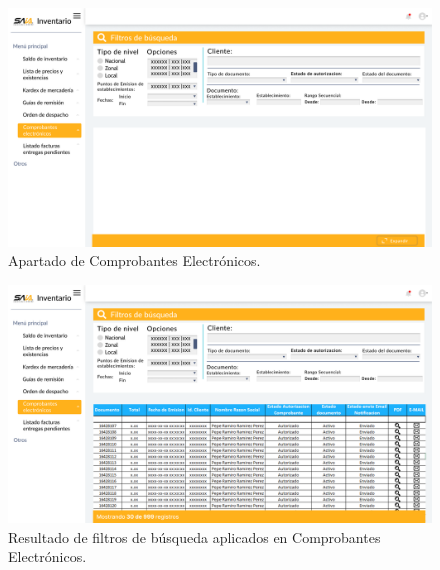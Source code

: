 \documentclass{scrreprt}
\begin{document}
    \begin{figure}[!htpb]
        \centerline{\includegraphics[scale=.22]{images/prototype/web/Comprobantes emitidos.png}}
        \caption{Apartado de Comprobantes Electrónicos.}
        \label{fig}
    \end{figure}
    \FloatBarrier
    \begin{figure}[!htpb]
        \centerline{\includegraphics[scale=.22]{images/prototype/web/Comprobantes emitidos 2.png}}
        \caption{Resultado de filtros de búsqueda aplicados en Comprobantes Electrónicos.}
        \label{fig}
    \end{figure}
    \FloatBarrier
    
\end{document}
